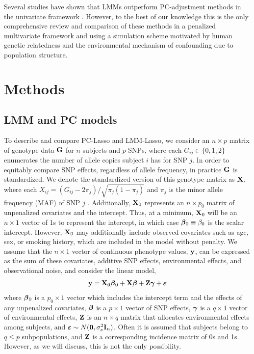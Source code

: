 Several studies have shown that LMMs outperform PC-adjustment methods in the univariate framework \citep{wang2013analytical, kang2010variance, zhao2007arabidopsis}. However, to the best of our knowledge this is the only comprehensive review and comparison of these methods in a penalized multivariate framework and using a simulation scheme motivated by human genetic relatedness and the environmental mechanism of confounding due to population structure.\\

\section{Methods} \label{sec:methods}



\subsection{LMM and PC models}

To describe and compare PC-Lasso and LMM-Lasso, we consider an $n \times p$ matrix of genotype data $\textbf{G}$ for $n$ subjects and $p$ SNPs, where each $G_{ij} \in \{ 0, 1, 2 \}$ enumerates the number of allele copies subject $i$ has for SNP $j$. In order to equitably compare SNP effects, regardless of allele frequency, in practice $\textbf{G}$ is standardized. We denote the standardized version of this genotype matrix as $\textbf{X}$, where each $X_{ij} = (G_{ij} - 2 \pi_j) / \sqrt{\pi_j (1 - \pi_j)}$ and $\pi_j$ is the minor allele frequency (MAF) of SNP $j$ \citep{zhang2015principal, price2006principal}. Additionally, $\textbf{X}_0$ represents an $n \times p_0$ matrix of unpenalized covariates and the intercept. Thus, at a minimum, $\textbf{X}_0$ will be an $n \times 1$ vector of 1s to represent the intercept, in which case $\boldsymbol{\beta}{}_0 \equiv \beta_0$ is the scalar intercept. However, $\textbf{X}_0$ may additionally include observed covariates such as age, sex, or smoking history, which are included in the model without penalty. We assume that the $n \times 1$ vector of continuous phenotype values, $\textbf{y}$, can be expressed as the sum of these covariates, additive SNP effects, environmental effects, and observational noise, and consider the linear model,
\begin{equation}
    \label{eqn:model}
    \textbf{y} = \textbf{X}_0 \boldsymbol{\beta}{}_0 + \textbf{X}\boldsymbol{\beta}{} + \textbf{Z}\boldsymbol{\gamma} + \boldsymbol{\varepsilon}{}
\end{equation}
where $\boldsymbol{\beta}{}_0$ is a $p_0 \times 1$ vector which includes the intercept term and the effects of any unpenalized covariates, $\boldsymbol{\beta}{}$ is a $p \times 1$ vector of SNP effects, $\boldsymbol{\gamma}$ is a $q \times 1$ vector of environmental effects, $\textbf{Z}$ is an $n \times q$ matrix that allocates environmental effects among subjects, and $\boldsymbol{\varepsilon}{} \sim N(\boldsymbol{0}, \sigma^2_e \textbf{I}_n)$. Often it is assumed that subjects belong to $q \le p$ subpopulations, and $\textbf{Z}$ is a corresponding incidence matrix of 0s and 1s. However, as we will discuss, this is not the only possibility.

